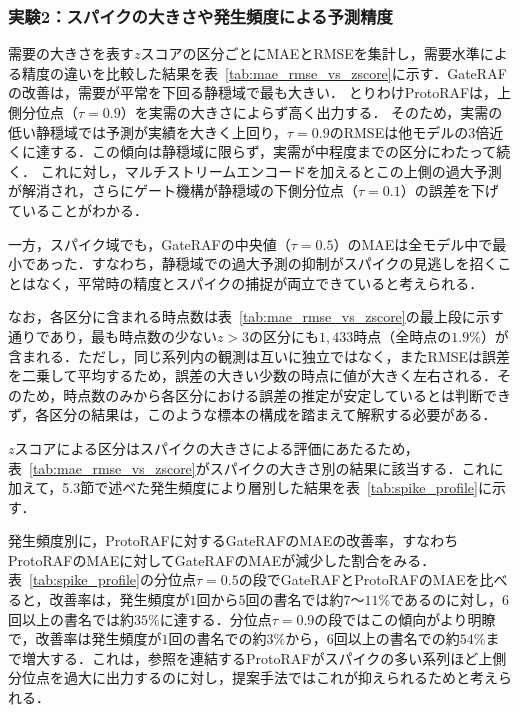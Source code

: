 \documentclass[twocolumn, lastpage]{jarticle}
\newif\ifrevmark
\newcommand{\revA}[1]{\ifrevmark{\color{blue}#1}\else#1\fi}
\newcommand{\revB}[1]{\ifrevmark{\color{red}#1}\else#1\fi}
\begin{document}
\subsubsection{実験2：\revA{スパイクの大きさや発生頻度による予測精度}}
需要の大きさを表す$z$スコアの区分ごとにMAEとRMSEを集計し，需要水準による精度の違いを比較した結果を表~\ref{tab:mae_rmse_vs_zscore}に示す．GateRAFの改善は，需要が平常を下回る静穏域で最も大きい．
%
とりわけProtoRAFは，上側分位点（$\tau=0.9$）を実需の大きさによらず高く出力する．
そのため，実需の低い静穏域では予測が実績を大きく上回り，$\tau=0.9$のRMSEは他モデルの3倍近くに達する．この傾向は静穏域に限らず，実需が中程度までの区分にわたって続く．
%
これに対し，マルチストリームエンコードを加えるとこの上側の過大予測が解消され，さらにゲート機構が静穏域の下側分位点（$\tau=0.1$）の誤差を下げていることがわかる．

一方，スパイク域でも，GateRAFの中央値（$\tau=0.5$）のMAEは全モデル中で最小であった．すなわち，静穏域での過大予測の抑制がスパイクの見逃しを招くことはなく，平常時の精度とスパイクの捕捉が両立できていると考えられる．

\revB{なお，各区分に含まれる時点数は表~\ref{tab:mae_rmse_vs_zscore}の最上段に示す通りであり，最も時点数の少ない$z>3$の区分にも$1{,}433$時点（全時点の$1.9\%$）が含まれる．ただし，同じ系列内の観測は互いに独立ではなく，またRMSEは誤差を二乗して平均するため，誤差の大きい少数の時点に値が大きく左右される．そのため，時点数のみから各区分における誤差の推定が安定しているとは判断できず，各区分の結果は，このような標本の構成を踏まえて解釈する必要がある．}

\revA{$z$スコアによる区分はスパイクの大きさによる評価にあたるため，表~\ref{tab:mae_rmse_vs_zscore}がスパイクの大きさ別の結果に該当する．これに加えて，5.3節で述べた発生頻度により層別した結果を表~\ref{tab:spike_profile}に示す．}

\revA{発生頻度別に，ProtoRAFに対するGateRAFのMAEの改善率，すなわちProtoRAFのMAEに対してGateRAFのMAEが減少した割合をみる．表~\ref{tab:spike_profile}の分位点$\tau=0.5$の段でGateRAFとProtoRAFのMAEを比べると，改善率は，発生頻度が$1$回から$5$回の書名では約$7$〜$11\%$であるのに対し，$6$回以上の書名では約$35\%$に達する．分位点$\tau=0.9$の段ではこの傾向がより明瞭で，改善率は発生頻度が$1$回の書名での約$3\%$から，$6$回以上の書名での約$54\%$まで増大する．これは，参照を連結するProtoRAFがスパイクの多い系列ほど上側分位点を過大に出力するのに対し，提案手法ではこれが抑えられるためと考えられる．}
\end{document}
